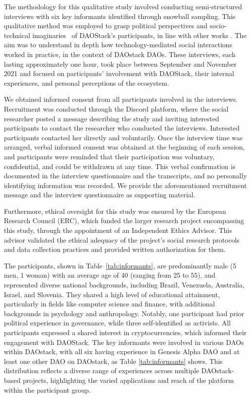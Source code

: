 \documentclass[10pt,lineno]{wlpeerj}
\begin{document}
The methodology for this qualitative study involved conducting semi-structured interviews with six key informants identified through snowball sampling. This qualitative method was employed to grasp political perspectives and socio-technical imaginaries~\citep{Jasanoff2015} 
of DAOStack’s participants, in line with other works \citep{semenzin_blockchain-based_2022}. The aim was to understand in depth how technology-mediated social interactions worked in practice, in the context of DAOstack DAOs. These interviews, each lasting approximately one hour, took place between September and November 2021 and focused on participants’ involvement with DAOStack, their internal experiences, and personal perceptions of the ecosystem. 

We obtained informed consent from all participants involved in the interviews. Recruitment was conducted through the Discord platform, where the social researcher posted a message describing the study and inviting interested participants to contact the researcher who conducted the interviews. Interested participants contacted her directly and voluntarily. Once the interview time was arranged, verbal informed consent was obtained at the beginning of each session, and participants were reminded that their participation was voluntary, confidential, and could be withdrawn at any time. This verbal confirmation is documented in the interview questionnaire and the transcripts, and no personally identifying information was recorded. We provide the aforementioned recruitment message and the interview questionnaire as supporting material. 

Furthermore, ethical oversight for this study was ensured by the European Research Council (ERC), which funded the larger research project encompassing this study, through the appointment of an Independent Ethics Advisor. This advisor validated the ethical adequacy of the project's social research protocols and data collection practices and provided written authorization for them.


The participants, shown in Table~\ref{tab:informants}, are predominantly male (5 men, 1 woman) with an average age of 40 (ranging from 25 to 55), and represented diverse national backgrounds, including Brazil, Venezuela, Australia, Israel, and Slovenia. They shared a high level of educational attainment, particularly in fields like computer science and finance, with additional backgrounds in psychology and anthropology. Notably, one participant had prior political experience in governance, while three self-identified as activists. All participants expressed a shared interest in cryptocurrencies, which informed their engagement with DAOStack. The key informants were involved in various DAOs within DAOstack, with all six having experience in Genesis Alpha DAO and at least one other DAO on DAOstack, as Table \ref{tab:informants} shows. This distribution reflects a diverse range of experiences across multiple DAOstack-based projects, highlighting the varied applications and reach of the platform within the participant group.
\end{document}
